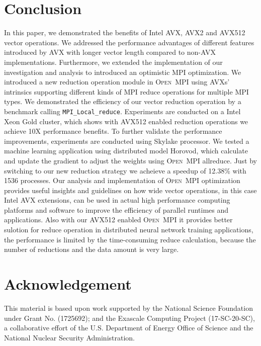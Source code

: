 \documentclass[sigconf]{acmart}
\newcommand{\mpifunc}[1]{\lstinline"MPI_#1"\xspace}
\newcommand{\ompi}[0]{\textsc{Open~MPI}\xspace}
\newcommand{\mpi}[0]{\textsc{MPI}\xspace}
\begin{document}
\section{Conclusion}\label{sec:conclusion}
In this paper, we demonstrated the benefits of Intel AVX, AVX2 and AVX512 vector operations. We
addressed the performance advantages of different features introduced by AVX
with longer vector length compared to non-AVX implementations. Furthermore,
we extended the implementation of our investigation and analysis to introduced
an optimistic \mpi optimization.
%
We introduced
a new reduction operation module in \ompi using AVXs' intrinsics supporting
different kinds of \mpi reduce operations for multiple \mpi types. We
demonstrated the efficiency of our vector reduction operation by a benchmark
calling \mpifunc{Local_reduce}. Experiments are conducted on a Intel Xeon Gold cluster,
which shows with AVX512 enabled reduction operations we achieve 10X performance benefits.
To further validate the performance improvements,
experiments are conducted using Skylake processor. We tested a machine learning application using distributed model Horovod, which calculate and update the gradient to adjust the weights using \ompi allreduce.
Just by switching to our new reduction strategy we acheieve a speedup of 12.38\% with 1536 processes.
Our analysis and implementation of
\ompi optimization provides useful insights and guidelines on how wide vector operations, in this case Intel AVX extensions, can be used in actual high performance computing platforms and
software to improve the efficiency of parallel runtimes and applications.
Also with our AVX512 enabled \ompi it provides better sulotion for reduce operation in distributed neural network
training applications, the performance is limited by the time-consuming reduce calculation, because the number of reductions and the data amount is very large.

\section*{Acknowledgement}
%
This material is based upon work supported by the National Science Foundation under Grant No. (1725692); and the Exascale Computing Project (17-SC-20-SC), a collaborative effort of the
U.S. Department of Energy Office of Science and the National Nuclear Security Administration.

%
%


\end{document}

